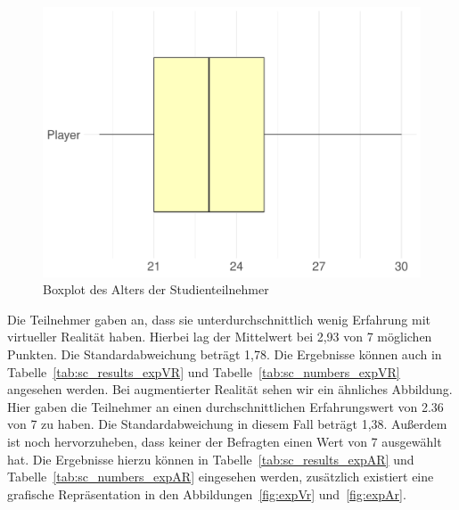 \begin{figure}
	\includegraphics[width=\textwidth]{./appendices/age}
	\caption{Boxplot des Alters der Studienteilnehmer}
	\label{fig:age}
\end{figure}

Die Teilnehmer gaben an, dass sie unterdurchschnittlich wenig Erfahrung mit virtueller Realität haben. Hierbei lag der Mittelwert bei 2,93 von 7 möglichen Punkten. Die Standardabweichung beträgt 1,78. Die Ergebnisse können auch in Tabelle~\ref{tab:sc_results_expVR} und Tabelle~\ref{tab:sc_numbers_expVR} angesehen werden. Bei augmentierter Realität sehen wir ein ähnliches Abbildung. Hier gaben die Teilnehmer an einen durchschnittlichen Erfahrungswert von 2.36 von 7 zu haben. Die Standardabweichung in diesem Fall beträgt 1,38. Außerdem ist noch hervorzuheben, dass keiner der Befragten einen Wert von 7 ausgewählt hat. Die Ergebnisse hierzu können in Tabelle~\ref{tab:sc_results_expAR} und Tabelle~\ref{tab:sc_numbers_expAR} eingesehen werden, zusätzlich existiert eine grafische Repräsentation in den Abbildungen~\ref{fig:expVr} und~\ref{fig:expAr}.


